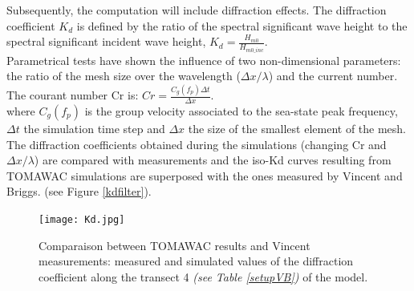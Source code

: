Subsequently, the computation will include diffraction effects.
The diffraction coefficient $K_d$ is defined by the ratio of the spectral significant wave height to the spectral significant incident wave height, $K_d = \frac{H_{m0}}{H_{m0\_ inc}}$.\\
Parametrical tests have shown the influence of two non-dimensional parameters: the ratio of the mesh size over the wavelength ($\Delta x / \lambda$) and the current number.
The courant number Cr is: $Cr = \frac{C_g(f_p)\Delta t}{\Delta x}$.\\
where $C_g(f_p)$ is the group velocity associated to the sea-state peak frequency, $\Delta t$ the simulation time step and $\Delta x$ the size of the smallest element of the mesh.\\
The diffraction coefficients obtained during the simulations (changing Cr and $\Delta x / \lambda $) are compared with measurements \cite{Vincent1989} and the iso-Kd curves resulting from TOMAWAC simulations are superposed with the ones measured by Vincent and Briggs. (see Figure \ref{kdfilter}).


\begin{figure}[!h]
  \centering
    \texttt{[image: Kd.jpg]}
      \caption{Comparaison between TOMAWAC results and Vincent measurements: measured and simulated values of the diffraction coefficient along the transect 4 \textit{(see Table \ref{setupVB})} of the model.}
\label{kd4}
\end{figure}

